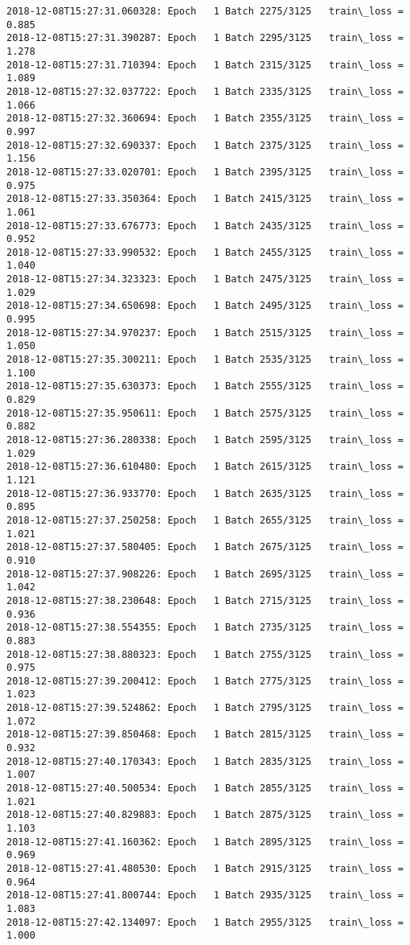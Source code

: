 \documentclass[11pt]{article}
\begin{document}
\begin{Verbatim}[commandchars=\\\{\}]
2018-12-08T15:27:31.060328: Epoch   1 Batch 2275/3125   train\_loss = 0.885
2018-12-08T15:27:31.390287: Epoch   1 Batch 2295/3125   train\_loss = 1.278
2018-12-08T15:27:31.710394: Epoch   1 Batch 2315/3125   train\_loss = 1.089
2018-12-08T15:27:32.037722: Epoch   1 Batch 2335/3125   train\_loss = 1.066
2018-12-08T15:27:32.360694: Epoch   1 Batch 2355/3125   train\_loss = 0.997
2018-12-08T15:27:32.690337: Epoch   1 Batch 2375/3125   train\_loss = 1.156
2018-12-08T15:27:33.020701: Epoch   1 Batch 2395/3125   train\_loss = 0.975
2018-12-08T15:27:33.350364: Epoch   1 Batch 2415/3125   train\_loss = 1.061
2018-12-08T15:27:33.676773: Epoch   1 Batch 2435/3125   train\_loss = 0.952
2018-12-08T15:27:33.990532: Epoch   1 Batch 2455/3125   train\_loss = 1.040
2018-12-08T15:27:34.323323: Epoch   1 Batch 2475/3125   train\_loss = 1.029
2018-12-08T15:27:34.650698: Epoch   1 Batch 2495/3125   train\_loss = 0.995
2018-12-08T15:27:34.970237: Epoch   1 Batch 2515/3125   train\_loss = 1.050
2018-12-08T15:27:35.300211: Epoch   1 Batch 2535/3125   train\_loss = 1.100
2018-12-08T15:27:35.630373: Epoch   1 Batch 2555/3125   train\_loss = 0.829
2018-12-08T15:27:35.950611: Epoch   1 Batch 2575/3125   train\_loss = 0.882
2018-12-08T15:27:36.280338: Epoch   1 Batch 2595/3125   train\_loss = 1.029
2018-12-08T15:27:36.610480: Epoch   1 Batch 2615/3125   train\_loss = 1.121
2018-12-08T15:27:36.933770: Epoch   1 Batch 2635/3125   train\_loss = 0.895
2018-12-08T15:27:37.250258: Epoch   1 Batch 2655/3125   train\_loss = 1.021
2018-12-08T15:27:37.580405: Epoch   1 Batch 2675/3125   train\_loss = 0.910
2018-12-08T15:27:37.908226: Epoch   1 Batch 2695/3125   train\_loss = 1.042
2018-12-08T15:27:38.230648: Epoch   1 Batch 2715/3125   train\_loss = 0.936
2018-12-08T15:27:38.554355: Epoch   1 Batch 2735/3125   train\_loss = 0.883
2018-12-08T15:27:38.880323: Epoch   1 Batch 2755/3125   train\_loss = 0.975
2018-12-08T15:27:39.200412: Epoch   1 Batch 2775/3125   train\_loss = 1.023
2018-12-08T15:27:39.524862: Epoch   1 Batch 2795/3125   train\_loss = 1.072
2018-12-08T15:27:39.850468: Epoch   1 Batch 2815/3125   train\_loss = 0.932
2018-12-08T15:27:40.170343: Epoch   1 Batch 2835/3125   train\_loss = 1.007
2018-12-08T15:27:40.500534: Epoch   1 Batch 2855/3125   train\_loss = 1.021
2018-12-08T15:27:40.829883: Epoch   1 Batch 2875/3125   train\_loss = 1.103
2018-12-08T15:27:41.160362: Epoch   1 Batch 2895/3125   train\_loss = 0.969
2018-12-08T15:27:41.480530: Epoch   1 Batch 2915/3125   train\_loss = 0.964
2018-12-08T15:27:41.800744: Epoch   1 Batch 2935/3125   train\_loss = 1.083
2018-12-08T15:27:42.134097: Epoch   1 Batch 2955/3125   train\_loss = 1.000

\end{Verbatim}
\end{document}
